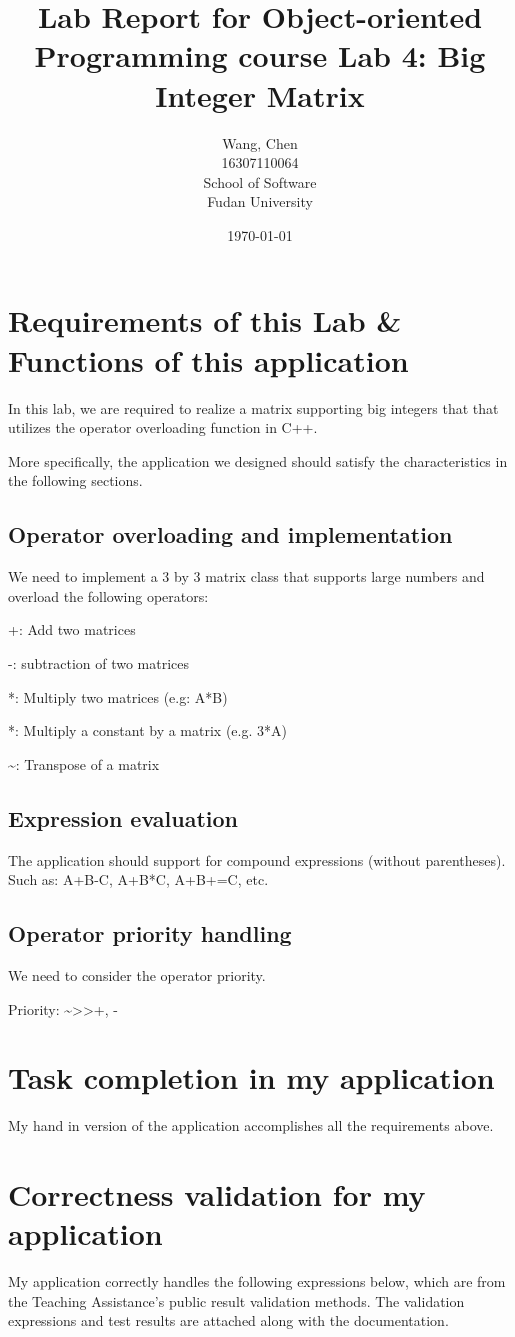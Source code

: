 \documentclass[a4paper]{report}
\title{Lab Report for Object-oriented Programming course \newline
 Lab 4: Big Integer Matrix}
\author{Wang, Chen \\ 16307110064 \\ School of Software\\ Fudan University}
\date{\today}
\begin{document}
\maketitle

\tableofcontents

\chapter{Requirements of this Lab \& Functions of this application}
In this lab, we are required to realize a matrix supporting big integers that that utilizes the operator overloading function in C++.
\par
More specifically, the application we designed should satisfy the characteristics in the following sections.
\section{Operator overloading and implementation}
We need to implement a 3 by 3 matrix class that supports large numbers and overload the following operators:
\par
+: Add two matrices
\par
-: subtraction of two matrices
\par 
*: Multiply two matrices (e.g: A*B)
\par
*: Multiply a constant by a matrix (e.g. 3*A)
\par
\textasciitilde : Transpose of a matrix
\section{Expression evaluation}
The application should support for compound expressions (without parentheses). Such as: A+B-C, A+B*C, A+B+=C, etc.
\section{Operator priority handling}
We need to consider the operator priority.
\par
Priority: \textasciitilde \textgreater * \textgreater +, -
\chapter{Task completion in my application}
My hand in version of the application accomplishes all the requirements above.
\chapter{Correctness validation for my application}
My application correctly handles the following expressions below, which are from the Teaching Assistance's public result validation methods. 
The validation expressions and test results are attached along with the documentation.
\end{document}
